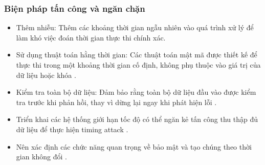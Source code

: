 \subsubsection{Biện pháp tấn công và ngăn chặn}
\begin{itemize}
    \item Thêm nhiễu: Thêm các khoảng thời gian ngẫu nhiên vào quá trình xử lý để làm khó việc đoán thời gian thực thi chính xác.
    \item Sử dụng thuật toán hằng thời gian: Các thuật toán mật mã được thiết kế để thực thi trong một khoảng thời gian cố định, không phụ thuộc vào giá trị của dữ liệu hoặc khóa \cite{biswas2017survey}.
    \item Kiểm tra toàn bộ dữ liệu: Đảm bảo rằng toàn bộ dữ liệu đầu vào được kiểm tra trước khi phản hồi, thay vì dừng lại ngay khi phát hiện lỗi \cite{dhem2000practical}.
    \item Triển khai các hệ thống giới hạn tốc độ có thể ngăn kẻ tấn công thu thập đủ dữ liệu để thực hiện timing attack \cite{biswas2017survey}.
    \item  Nên xác định các chức năng quan trọng về bảo mật và tạo chúng theo thời gian không đổi \cite{dhem2000practical}.
\end{itemize}
